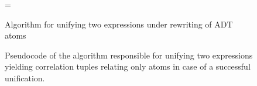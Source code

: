 \begin{figure}
\begin{algorithm}[H]
\begin{footnotesize}
\DontPrintSemicolon
\everypar={\nl}
\SetAlgoLined
{}
\end{footnotesize}
\caption{Algorithm for unifying two expressions under rewriting of ADT atoms}
\end{algorithm}
\caption{\label{algo:unifyandrewrite}Pseudocode of the algorithm responsible for unifying two expressions
yielding correlation tuples relating only atoms in case of a successful unification.}
\end{figure}